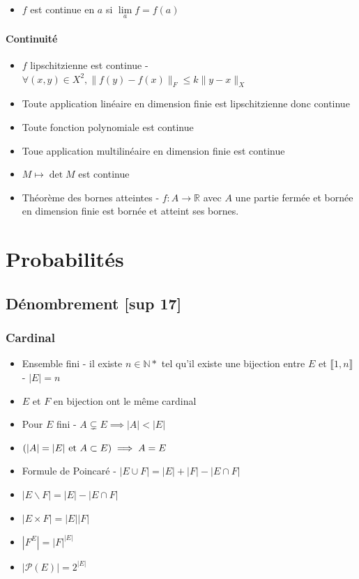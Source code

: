 \documentclass[openany]{book}
\begin{document}
\begin{itemize}
    \item $f$ est continue en $a$ si $\underset{a}{\lim} f = f(a)$
\end{itemize}

\subsubsection{Continuité}

\begin{itemize}
    \item $f$ lipschitzienne est continue - $\forall (x, y) \in X^2, \|f(y) - f(x)\|_{F} \leq k \|y-x\|_{X}$
    \item Toute application linéaire en dimension finie est lipschitzienne donc continue
    \item Toute fonction polynomiale est continue
    \item Toue application multilinéaire en dimension finie est continue 
    \item $M \mapsto \det M$ est continue
    \item Théorème des bornes atteintes - $f : A \rightarrow \mathbb{R}$ avec $A$ une partie fermée et bornée en dimension finie est bornée et atteint ses bornes. 
\end{itemize}

\clearpage

\chapter{Probabilités}
\section{Dénombrement [sup 17]}

\subsection{Cardinal}
\begin{itemize}
    \item Ensemble fini - il existe $n \in \mathbb{N}*$ tel qu'il existe une bijection entre $E$ et $ \llbracket 1, n \rrbracket $ - $|E| = n$
    \item $E$ et $F$ en bijection ont le même cardinal
    \item Pour $E$ fini - $A \subsetneq E \implies |A| < |E|$ 
    \item $(|A| = |E| \text{ et } A \subset E) \implies A = E$
    \item Formule de Poincaré - $|E \cup F| = |E| + |F| - |E \cap F|$
    \item $|E \backslash F| = |E| - |E \cap F|$
    \item $|E \times F| = |E||F|$
    \item $|F^E| = |F|^{|E|}$
    \item $|\mathcal{P}(E)| = 2^{|E|}$ 
\end{itemize}
\end{document}
